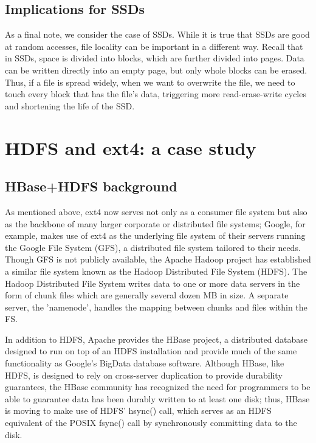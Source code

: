 \documentclass{acm_proc_article-sp}
\begin{document}
\subsection{Implications for SSDs}
As a final note, we consider the case of SSDs.  While it is true that SSDs are good at random accesses, file locality can be important in a different way.  Recall that in SSDs, space is divided into blocks, which are further divided into pages. Data can be written directly into an empty page, but only whole blocks can be erased. Thus, if a file is spread widely, when we want to overwrite the file, we need to touch every block that has the file's data, triggering more read-erase-write cycles and shortening the life of the SSD.


\section{HDFS and ext4: a case study}
\label{sec:HDFS-and-ext4-a-case-study}
\subsection{HBase+HDFS background}
As mentioned above, ext4 now serves not only as a consumer file system but also as the backbone of many larger corporate or distributed file systems; Google, for example, makes use of ext4 as the underlying file system of their servers running the Google File System (GFS), a distributed file system tailored to their needs\cite{ext4news}.  Though GFS is not publicly available, the Apache Hadoop project has established a similar file system known as the Hadoop Distributed File System (HDFS).  The Hadoop Distributed File System writes data to one or more data servers in the form of chunk files which are generally several dozen MB in size.  A separate server, the 'namenode', handles the mapping between chunks and files within the FS. 

 
 
 
 
 


 
In addition to HDFS, Apache provides the HBase project, a distributed database designed to run on top of an HDFS installation and provide much of the same functionality as Google's BigData database software.  Although HBase, like HDFS, is designed to rely on cross-server duplication to provide durability guarantees, the HBase community has recognized the need for programmers to be able to guarantee data has been durably written to at least one disk; thus, HBase is moving to make use of HDFS' hsync() call, which serves as an HDFS equivalent of the POSIX fsync() call by synchronously committing data to the disk.
 
\end{document}
